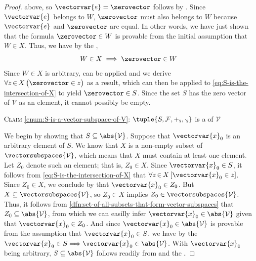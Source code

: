 \begin{proof}
    above, so \( \vectorvar{e} = \zerovector \) follows by .
    Since \( \vectorvar{e} \) belongs to \( W \), \( \zerovector \) must also belongs to \( W \) because \( \vectorvar{e} \) and \( \zerovector\) are equal.
    In other words, we have just shown that the formula \( \zerovector \in W \) is provable from the initial assumption that \( W \in X \). Thus, we have by the
    ,
    \begin{equation*}
        W \in X \implies \zerovector \in W
    \end{equation*}
    Since \( W \in X \) is arbitrary,  can be applied and we derive
    \( \forall z\,{\in}\,X \, \big( \zerovector \in z \big) \) as a result, which can then be applied to \eqref{eq:S-is-the-intersection-of-X}
    to yield \( \zerovector \in S \).
    Since the set \( S \) has the zero vector of \( \mathcal{V} \) as an element, it cannot possibly be empty.

    \vspace{0.5cm}
    \noindent
    {\scshape Claim} \ref{enum:S-is-a-vector-subspace-of-V}: \( \tuple{S, \mathcal{F}, \smallsubscript{+}{S}, \smallsubscript{\cdot}{S}} \)
        is a  of \( \mathcal{V} \)

    \vspace{0.1cm}
    \noindent
    We begin by showing that \( S \subseteq \abs{\mathcal{V}} \). Suppose that \( \vectorvar{x}_{0} \) is an arbitrary element of \( S \).
    We know that \( X \) is a non-empty subset of \( \vectorsubspaces{\mathcal{V}} \), which means that \( X \) must contain at least one element.
    Let \( Z_{0} \) denote such an element; that is, \( Z_{0} \in X \).
    Since \( \vectorvar{x}_{0} \in S \), it follows from \eqref{eq:S-is-the-intersection-of-X} that \( \forall z\,{\in}\,X \, \mleft[ \vectorvar{x}_{0} \in z \mright] \).
    Since \( Z_{0} \in X \), we conclude by  that \( \vectorvar{x}_{0} \in Z_{0} \).
    But \( X \subseteq \vectorsubspaces{\mathcal{V}} \), so \( Z_{0} \in X \) implies \( Z_{0} \in \vectorsubspaces{\mathcal{V}} \).
    Thus, it follows from \cref{dfn:set-of-all-subsets-that-form-vector-subspaces} that \( Z_{0} \subseteq \abs{\mathcal{V}} \),
    from which we can easilly infer \( \vectorvar{x}_{0} \in \abs{\mathcal{V}} \) given that \( \vectorvar{x}_{0} \in Z_{0} \).
    And since \( \vectorvar{x}_{0} \in \abs{\mathcal{V}} \) is provable from the assumption that \( \vectorvar{x}_{0} \in S \), we have by the
     \( \vectorvar{x}_{0} \in S {\implies} \vectorvar{x}_{0} \in \abs{\mathcal{V}} \).
    With \( \vectorvar{x}_{0} \) being arbitrary,
    \( S \subseteq \abs{\mathcal{V}} \) follows readily from 
    and the .


\end{proof}
